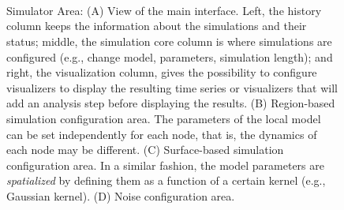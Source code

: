 		\begin{figure}[!htbp]

		\centering
			\\
			\\
			\\
			\caption{\TVB Simulator Area: 
			(A) View of the main interface. Left, the history column keeps the information about the simulations and their status; middle, the simulation core column is where simulations are configured (e.g., change model, parameters, simulation length); and right, the visualization column, gives the possibility to configure visualizers to display the resulting time series or visualizers that will add an analysis step before displaying the results.  
			(B) Region-based simulation configuration area. The parameters of the local model can be set independently for each node, that is, the dynamics of each node may be different. 
			(C) Surface-based simulation configuration area. In a similar fashion, the model parameters are \emph{spatialized} by defining them as a function of a certain kernel (e.g., Gaussian kernel).
			(D) Noise configuration area. }
		\label{fig:simulator}
		\end{figure}

